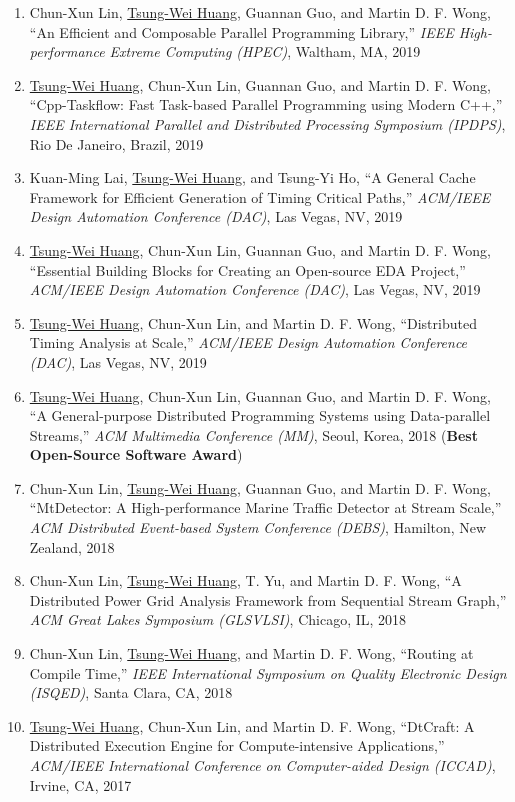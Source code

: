 \documentclass[A4,11pt]{article}
\begin{document}
\begin{enumerate}
    \item Chun-Xun Lin, \underline{Tsung-Wei Huang}, Guannan Guo, and Martin D. F. Wong, ``An Efficient and Composable Parallel Programming Library,'' \textit{IEEE High-performance Extreme Computing (HPEC)}, Waltham, MA, 2019
    \item \underline{Tsung-Wei Huang}, Chun-Xun Lin, Guannan Guo, and Martin D. F. Wong, ``Cpp-Taskflow: Fast Task-based Parallel Programming using Modern C++,'' \textit{IEEE International Parallel and Distributed Processing Symposium (IPDPS)}, Rio De Janeiro, Brazil, 2019
    \item Kuan-Ming Lai, \underline{Tsung-Wei Huang}, and Tsung-Yi Ho, ``A General Cache Framework for Efficient Generation of Timing Critical Paths,'' \textit{ACM/IEEE Design Automation Conference (DAC)}, Las Vegas, NV, 2019
    \item \underline{Tsung-Wei Huang}, Chun-Xun Lin, Guannan Guo, and Martin D. F. Wong, ``Essential Building Blocks for Creating an Open-source EDA Project,'' \textit{ACM/IEEE Design Automation Conference (DAC)}, Las Vegas, NV, 2019
    \item \underline{Tsung-Wei Huang}, Chun-Xun Lin, and Martin D. F. Wong, ``Distributed Timing Analysis at Scale,'' \textit{ACM/IEEE Design Automation Conference (DAC)}, Las Vegas, NV, 2019
    \item \underline{Tsung-Wei Huang}, Chun-Xun Lin, Guannan Guo, and Martin D. F. Wong, ``A General-purpose Distributed Programming Systems using Data-parallel Streams,'' \textit{ACM Multimedia Conference (MM)}, Seoul, Korea, 2018 (\textbf{Best Open-Source Software Award}) 
    \item Chun-Xun Lin, \underline{Tsung-Wei Huang}, Guannan Guo, and Martin D. F. Wong, ``MtDetector: A High-performance Marine Traffic Detector at Stream Scale,'' \textit{ACM Distributed Event-based System Conference (DEBS)}, Hamilton, New Zealand, 2018
    \item Chun-Xun Lin, \underline{Tsung-Wei Huang}, T. Yu, and Martin D. F. Wong, ``A Distributed Power Grid Analysis Framework from Sequential Stream Graph,'' \textit{ACM Great Lakes Symposium (GLSVLSI)}, Chicago, IL, 2018
    \item Chun-Xun Lin, \underline{Tsung-Wei Huang}, and Martin D. F. Wong, ``Routing at Compile Time,'' \textit{IEEE International Symposium on Quality Electronic Design (ISQED)}, Santa Clara, CA, 2018
    \item \underline{Tsung-Wei Huang}, Chun-Xun Lin, and Martin D. F. Wong, ``DtCraft: A Distributed Execution Engine for Compute-intensive Applications,'' \textit{ACM/IEEE International Conference on Computer-aided Design (ICCAD)}, Irvine, CA, 2017

\end{enumerate}
\end{document}

